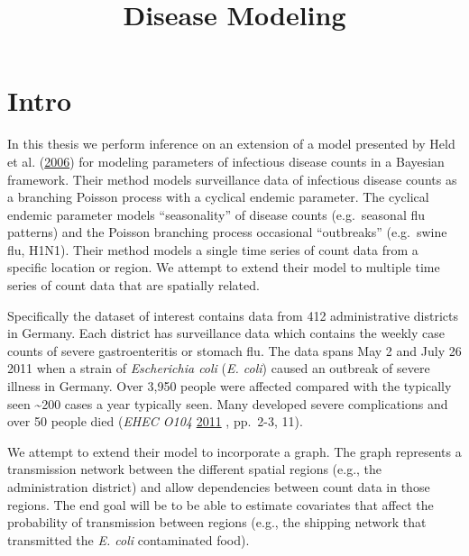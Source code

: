 \documentclass[]{article}
\title{Disease Modeling}
\author{}
\date{}
\numberwithin{equation}{section}
\begin{document}
\maketitle

\newcommand{\dw}[1]{{\color{red}{#1}}}

\hypertarget{intro}{%
\section{Intro}\label{intro}}

In this thesis we perform inference on an extension of a model presented
by Held et al. (\protect\hyperlink{ref-held_two-component_2006}{2006})
for modeling parameters of infectious disease counts in a Bayesian
framework. Their method models surveillance data of infectious disease
counts as a branching Poisson process with a cyclical endemic parameter.
The cyclical endemic parameter models ``seasonality'' of disease counts
(e.g.~seasonal flu patterns) and the Poisson branching process
occasional ``outbreaks'' (e.g.~swine flu, H1N1). Their method models a
single time series of count data from a specific location or region. We
attempt to extend their model to multiple time series of count data that
are spatially related.

Specifically the dataset of interest contains data from 412
administrative districts in Germany. Each district has surveillance data
which contains the weekly case counts of severe gastroenteritis or
stomach flu. The data spans May 2 and July 26 2011 when a strain of
\emph{Escherichia coli} (\emph{E. coli}) caused an outbreak of severe
illness in Germany. Over 3,950 people were affected compared with the
typically seen \textasciitilde{}200 cases a year typically seen. Many
developed severe complications and over 50 people died (\emph{EHEC O104}
\protect\hyperlink{ref-noauthor_ehec_2011}{2011} , pp.~2-3, 11).

We attempt to extend their model to incorporate a graph. The graph
represents a transmission network between the different spatial regions
(e.g., the administration district) and allow dependencies between count
data in those regions. The end goal will be to be able to estimate
covariates that affect the probability of transmission between regions
(e.g., the shipping network that transmitted the \emph{E. coli}
contaminated food).
\end{document}
